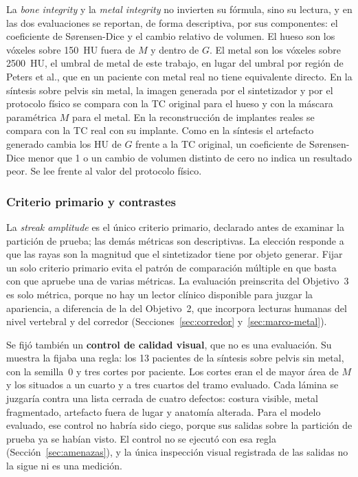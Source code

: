 La \emph{bone integrity} y la \emph{metal integrity} no invierten su fórmula, sino su lectura, y en las dos evaluaciones se reportan, de forma descriptiva, por sus componentes: el coeficiente de Sørensen-Dice y el cambio relativo de volumen. El hueso son los vóxeles sobre 150~HU fuera de $M$ y dentro de $G$. El metal son los vóxeles sobre 2500~HU, el umbral de metal de este trabajo, en lugar del umbral por región de Peters et al., que en un paciente con metal real no tiene equivalente directo. En la síntesis sobre pelvis sin metal, la imagen generada por el sintetizador y por el protocolo físico se compara con la TC original para el hueso y con la máscara paramétrica $M$ para el metal. En la reconstrucción de implantes reales se compara con la TC real con su implante. Como en la síntesis el artefacto generado cambia los HU de $G$ frente a la TC original, un coeficiente de Sørensen-Dice menor que 1 o un cambio de volumen distinto de cero no indica un resultado peor. Se lee frente al valor del protocolo físico.

\subsubsection{Criterio primario y contrastes}\label{sec:ap-contrastes}

La \emph{streak amplitude} es el único criterio primario, declarado antes de examinar la partición de prueba; las demás métricas son descriptivas. La elección responde a que las rayas son la magnitud que el sintetizador tiene por objeto generar. Fijar un solo criterio primario evita el patrón de comparación múltiple en que basta con que apruebe una de varias métricas. La evaluación preinscrita del Objetivo~3 es solo métrica, porque no hay un lector clínico disponible para juzgar la apariencia, a diferencia de la del Objetivo~2, que incorpora lecturas humanas del nivel vertebral y del corredor (Secciones~\ref{sec:corredor} y~\ref{sec:marco-metal}).

Se fijó también un \textbf{control de calidad visual}, que no es una evaluación. Su muestra la fijaba una regla: los 13 pacientes de la síntesis sobre pelvis sin metal, con la semilla~0 y tres cortes por paciente. Los cortes eran el de mayor área de $M$ y los situados a un cuarto y a tres cuartos del tramo evaluado. Cada lámina se juzgaría contra una lista cerrada de cuatro defectos: costura visible, metal fragmentado, artefacto fuera de lugar y anatomía alterada. Para el modelo evaluado, ese control no habría sido ciego, porque sus salidas sobre la partición de prueba ya se habían visto. El control no se ejecutó con esa regla (Sección~\ref{sec:amenazas}), y la única inspección visual registrada de las salidas no la sigue ni es una medición.

